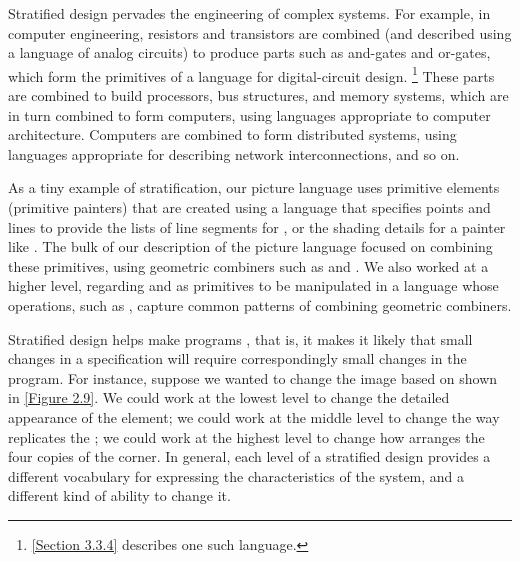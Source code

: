 Stratified design pervades the engineering of complex systems.
For example, in computer engineering, resistors and transistors are combined (and described using a language of analog circuits) to produce parts such as and-gates and or-gates, which form the primitives of a language for digital-circuit design.%
\footnote{
	\cref{Section 3.3.4} describes one such language.
}
These parts are combined to build processors, bus structures, and memory systems, which are in turn combined to form computers, using languages appropriate to computer architecture.
Computers are combined to form distributed systems, using languages appropriate for describing network interconnections, and so on.

As a tiny example of stratification, our picture language uses primitive elements (primitive painters) that are created using a language that specifies points and lines to provide the lists of line segments for , or the shading details for a painter like .
The bulk of our description of the picture language focused on combining these primitives, using geometric combiners such as  and .
We also worked at a higher level, regarding  and  as primitives to be manipulated in a language whose operations, such as , capture common patterns of combining geometric combiners.

Stratified design helps make programs , that is, it makes it likely that small changes in a specification will require correspondingly small changes in the program.
For instance, suppose we wanted to change the image based on  shown in \cref{Figure 2.9}.
We could work at the lowest level to change the detailed appearance of the  element;
we could work at the middle level to change the way  replicates the ;
we could work at the highest level to change how  arranges the four copies of the corner.
In general, each level of a stratified design provides a different vocabulary for expressing the characteristics of the system, and a different kind of ability to change it.




